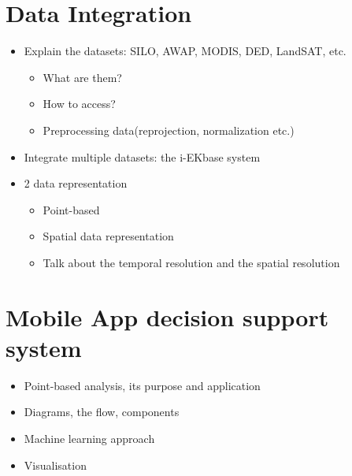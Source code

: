 \documentclass[12pt,journal,compsoc,onecolumn]{IEEEtran}
\begin{document}
\section{Data Integration}
\begin{itemize}
\item
Explain the datasets: SILO, AWAP, MODIS, DED, LandSAT, etc.
	\begin{itemize}
	\item
	What are them?
	\item
	How to access?
	\item
	Preprocessing data(reprojection, normalization etc.)
	\end{itemize}
\item
Integrate multiple datasets: the i-EKbase system
\item
2 data representation
	\begin{itemize}
	\item
	Point-based
	\item
	Spatial data representation
	\item
	Talk about the temporal resolution and the spatial resolution
	\end{itemize}
\end{itemize}

\section{Mobile App decision support system}
\begin{itemize}
\item
Point-based analysis, its purpose and application
\item
Diagrams, the flow, components
\item
Machine learning approach
\item
Visualisation
\end{itemize}
\end{document}
